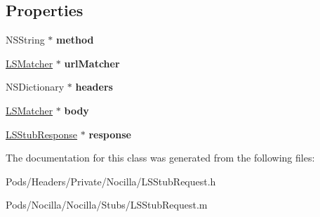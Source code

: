 \subsection*{Properties}
\begin{DoxyCompactItemize}
\item 
\hypertarget{interface_l_s_stub_request_a0443bfcaca50c27927f93cbd2b10e26f}{N\-S\-String $\ast$ {\bfseries method}}\label{interface_l_s_stub_request_a0443bfcaca50c27927f93cbd2b10e26f}

\item 
\hypertarget{interface_l_s_stub_request_ac0f0a430ccdfec30db095a77f53a5f94}{\hyperlink{interface_l_s_matcher}{L\-S\-Matcher} $\ast$ {\bfseries url\-Matcher}}\label{interface_l_s_stub_request_ac0f0a430ccdfec30db095a77f53a5f94}

\item 
\hypertarget{interface_l_s_stub_request_afd60213441214704c81d697753788c42}{N\-S\-Dictionary $\ast$ {\bfseries headers}}\label{interface_l_s_stub_request_afd60213441214704c81d697753788c42}

\item 
\hypertarget{interface_l_s_stub_request_aeed44611a84ab83f9fa5de3ffa12aad9}{\hyperlink{interface_l_s_matcher}{L\-S\-Matcher} $\ast$ {\bfseries body}}\label{interface_l_s_stub_request_aeed44611a84ab83f9fa5de3ffa12aad9}

\item 
\hypertarget{interface_l_s_stub_request_ad9fc3a37b7fb7d52d8d7255cb667fd22}{\hyperlink{interface_l_s_stub_response}{L\-S\-Stub\-Response} $\ast$ {\bfseries response}}\label{interface_l_s_stub_request_ad9fc3a37b7fb7d52d8d7255cb667fd22}

\end{DoxyCompactItemize}


The documentation for this class was generated from the following files\-:\begin{DoxyCompactItemize}
\item 
Pods/\-Headers/\-Private/\-Nocilla/L\-S\-Stub\-Request.\-h\item 
Pods/\-Nocilla/\-Nocilla/\-Stubs/L\-S\-Stub\-Request.\-m\end{DoxyCompactItemize}
